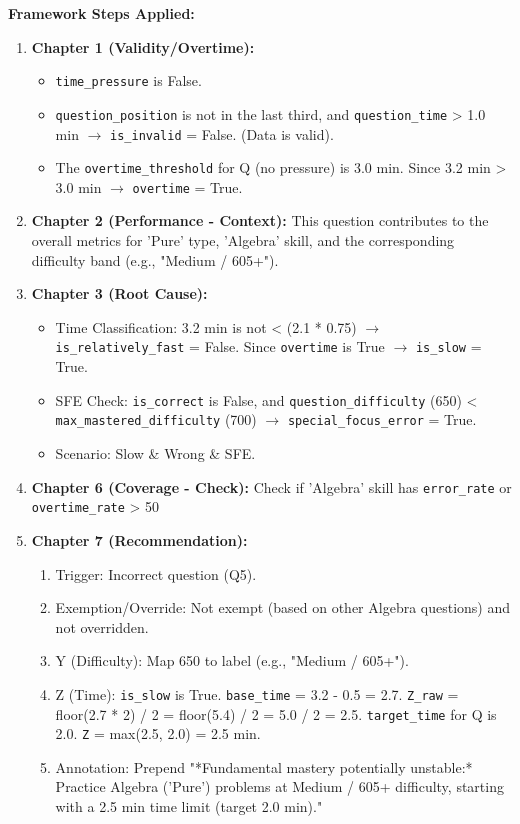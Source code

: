 \documentclass{article}
\begin{document}
\textbf{Framework Steps Applied:}
\begin{enumerate}
    \item \textbf{Chapter 1 (Validity/Overtime):} 
        \begin{itemize}
            \item \texttt{time\_pressure} is False. 
            \item \texttt{question\_position} is not in the last third, and \texttt{question\_time} > 1.0 min $\rightarrow$ \texttt{is\_invalid} = False. (Data is valid).
            \item The \texttt{overtime\_threshold} for Q (no pressure) is 3.0 min. Since 3.2 min > 3.0 min $\rightarrow$ \texttt{overtime} = True.
        \end{itemize}
    \item \textbf{Chapter 2 (Performance - Context):} This question contributes to the overall metrics for 'Pure' type, 'Algebra' skill, and the corresponding difficulty band (e.g., "Medium / 605+").
    \item \textbf{Chapter 3 (Root Cause):}
        \begin{itemize}
            \item Time Classification: 3.2 min is not < (2.1 * 0.75) $\rightarrow$ \texttt{is\_relatively\_fast} = False. Since \texttt{overtime} is True $\rightarrow$ \texttt{is\_slow} = True.
            \item SFE Check: \texttt{is\_correct} is False, and \texttt{question\_difficulty} (650) < \texttt{max\_mastered\_difficulty} (700) $\rightarrow$ \texttt{special\_focus\_error} = True.
            \item Scenario: Slow \& Wrong \& SFE.
        \end{itemize}
    \item \textbf{Chapter 6 (Coverage - Check):} Check if 'Algebra' skill has \texttt{error\_rate} or \texttt{overtime\_rate} > 50%
    \item \textbf{Chapter 7 (Recommendation):}
        \begin{enumerate}
            \item Trigger: Incorrect question (Q5).
            \item Exemption/Override: Not exempt (based on other Algebra questions) and not overridden.
            \item Y (Difficulty): Map 650 to label (e.g., "Medium / 605+").
            \item Z (Time): \texttt{is\_slow} is True. \texttt{base\_time} = 3.2 - 0.5 = 2.7. \texttt{Z\_raw} = floor(2.7 * 2) / 2 = floor(5.4) / 2 = 5.0 / 2 = 2.5. \texttt{target\_time} for Q is 2.0. \texttt{Z} = max(2.5, 2.0) = 2.5 min.
            \item Annotation: Prepend "*Fundamental mastery potentially unstable:* Practice Algebra ('Pure') problems at Medium / 605+ difficulty, starting with a 2.5 min time limit (target 2.0 min)."
        \end{enumerate}
\end{enumerate}
\end{document}

